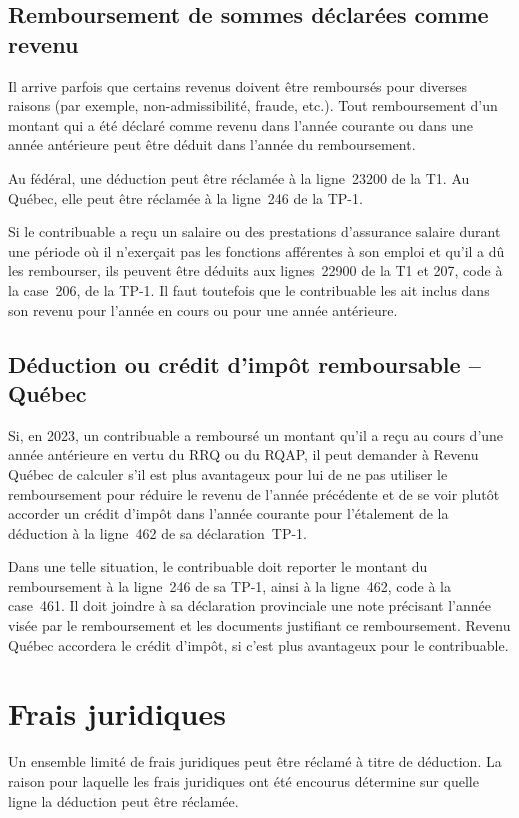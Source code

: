 \subsection{Remboursement de sommes déclarées comme revenu}
Il arrive parfois que certains revenus doivent être remboursés pour diverses raisons (par exemple, non-admissibilité, fraude, etc.). Tout remboursement d'un montant qui a été déclaré comme revenu dans l'année courante ou dans une année antérieure peut être déduit dans l'année du remboursement.

Au fédéral, une déduction peut être réclamée à la ligne~23200 de la T1. Au Québec, elle peut être réclamée à la ligne~246 de la TP-1.

Si le contribuable a reçu un salaire ou des prestations d'assurance salaire durant une période où il n'exerçait pas les fonctions afférentes à son emploi et qu'il a dû les rembourser, ils peuvent être déduits aux lignes~22900 de la T1 et 207, code  \fg{} à la case~206, de la TP-1. Il faut toutefois que le contribuable les ait inclus dans son revenu pour l'année en cours ou pour une année antérieure. 


\subsection{Déduction ou crédit d'impôt remboursable -- Québec}
Si, en 2023, un contribuable a remboursé un montant qu'il a reçu au cours d'une année antérieure en vertu du RRQ ou du RQAP, il peut demander à Revenu Québec de calculer s'il est plus avantageux pour lui de ne pas utiliser le remboursement pour réduire le revenu de l'année précédente et de se voir plutôt accorder un crédit d'impôt dans l'année courante pour l'étalement de la déduction à la ligne~462 de sa déclaration~TP-1. 

Dans une telle situation, le contribuable doit reporter le montant du remboursement à la ligne~246 de sa TP-1, ainsi à la ligne~462, code  \fg{} à la case~461. Il doit joindre à sa déclaration provinciale une note précisant l'année visée par le remboursement et les documents justifiant ce remboursement. Revenu Québec accordera le crédit d'impôt, si c'est plus avantageux pour le contribuable.



\section{Frais juridiques}
\begin{intro}
	Un ensemble limité de frais juridiques peut être réclamé à titre de déduction. La raison pour laquelle les frais juridiques ont été encourus détermine sur quelle ligne la déduction peut être réclamée.
\end{intro}

